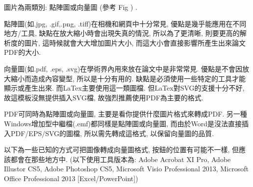 

圖片為兩類別: 點陣圖或向量圖 (參考 Fig ) .\\


點陣圖(如.jpg, .gif,.png, .tiff)在相機和網頁中十分常見, 優點是幾乎能應用在不同地方/工具, 缺點在放大縮小時會出現失真的情況, 所以為了更清晰, 則要更高的解析度的圖片, 這時候就會大大增加圖片大小, 而這大小會直接影響所產生出來論文PDF的大小.

向量圖(如.pdf, .eps, .svg)在學術界內用來放在論文中是非常常見. 優點是不會因放大縮小而造成內容變型, 所以是十分有用的. 缺點是必須使用一些特定的工具才能顯示或產生出來. 而LaTex主要使用這一類圖檔. 但LaTex對SVG的支援十分不好, 故這模板沒無提供插入SVG檔, 故強烈推薦使用PDF為主要的格式.

PDF可同時為點陣圖或向量圖, 主要是看你提供什麼圖片格式來轉成PDF. 另一種Windows增加型中繼檔(.emf)都同樣是點陣圖或向量圖, 而由於Word是沒法直接插入PDF/EPS/SVG的圖檔, 所以需先轉成這格式, 以保留向量圖的品質.

\newpage
{}

以下為一些已知的方式可把圖像轉成向量圖格式, 按鈕的位置有可能不一樣, 但應該都會在那些地方中. (以下使用工具版本為: Adobe Acrobat XI Pro, Adobe Illustor CS5, Adobe Photoshop CS5, Microsoft Visio Professional 2013, Microsoft Office Professional 2013 [Excel/PowerPoint])

